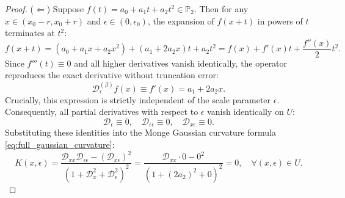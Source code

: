 \documentclass[11pt,a4paper]{article}
\theoremstyle{definition}
\begin{document}
\begin{proof}
($\Leftarrow$) Suppose $f(t) = a_0 + a_1 t + a_2 t^2 \in \mathbb{P}_2$. Then for any $x \in (x_0 - r, x_0 + r)$ and $\epsilon \in (0, \epsilon_0)$, the expansion of $f(x+t)$ in powers of $t$ terminates at $t^2$:
\begin{equation}
f(x + t) = (a_0 + a_1 x + a_2 x^2) + (a_1 + 2 a_2 x) t + a_2 t^2 = f(x) + f'(x) t + \frac{f''(x)}{2} t^2.
\end{equation}
Since $f'''(t) \equiv 0$ and all higher derivatives vanish identically, the operator reproduces the exact derivative without truncation error:
\begin{equation}
\mathcal{D}_\epsilon^{(\beta)} f(x) \equiv f'(x) = a_1 + 2 a_2 x.
\end{equation}
Crucially, this expression is strictly independent of the scale parameter $\epsilon$. Consequently, all partial derivatives with respect to $\epsilon$ vanish identically on $U$:
\begin{equation}
\mathcal{D}_\epsilon \equiv 0, \quad \mathcal{D}_{\epsilon\epsilon} \equiv 0, \quad \mathcal{D}_{x\epsilon} \equiv 0.
\end{equation}
Substituting these identities into the Monge Gaussian curvature formula \eqref{eq:full_gaussian_curvature}:
\begin{equation}
K(x, \epsilon) = \frac{\mathcal{D}_{xx} \mathcal{D}_{\epsilon\epsilon} - (\mathcal{D}_{x\epsilon})^2}{(1 + \mathcal{D}_x^2 + \mathcal{D}_\epsilon^2)^2} = \frac{\mathcal{D}_{xx} \cdot 0 - 0^2}{(1 + (2 a_2)^2 + 0)^2} = 0, \quad \forall (x, \epsilon) \in U.
\end{equation}


\end{proof}
\end{document}
